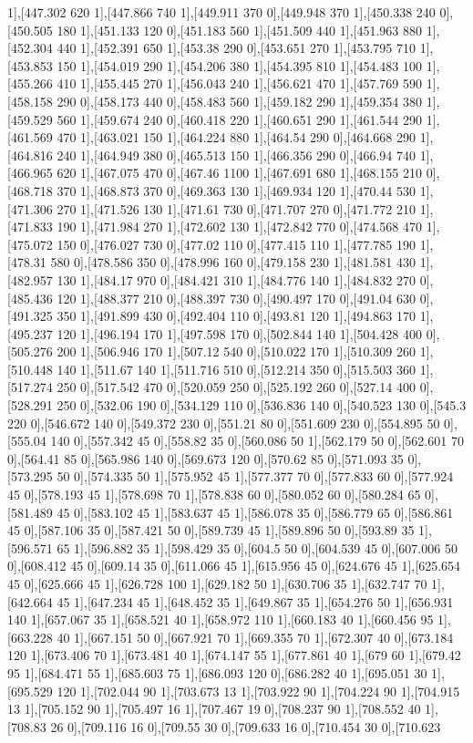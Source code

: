 {1],[447.302 620 1],[447.866 740 1],[449.911 370 0],[449.948 370 1],[450.338 240 0],[450.505 180 1],[451.133 120 0],[451.183 560 1],[451.509 440 1],[451.963 880 1],[452.304 440 1],[452.391 650 1],[453.38 290 0],[453.651 270 1],[453.795 710 1],[453.853 150 1],[454.019 290 1],[454.206 380 1],[454.395 810 1],[454.483 100 1],[455.266 410 1],[455.445 270 1],[456.043 240 1],[456.621 470 1],[457.769 590 1],[458.158 290 0],[458.173 440 0],[458.483 560 1],[459.182 290 1],[459.354 380 1],[459.529 560 1],[459.674 240 0],[460.418 220 1],[460.651 290 1],[461.544 290 1],[461.569 470 1],[463.021 150 1],[464.224 880 1],[464.54 290 0],[464.668 290 1],[464.816 240 1],[464.949 380 0],[465.513 150 1],[466.356 290 0],[466.94 740 1],[466.965 620 1],[467.075 470 0],[467.46 1100 1],[467.691 680 1],[468.155 210 0],[468.718 370 1],[468.873 370 0],[469.363 130 1],[469.934 120 1],[470.44 530 1],[471.306 270 1],[471.526 130 1],[471.61 730 0],[471.707 270 0],[471.772 210 1],[471.833 190 1],[471.984 270 1],[472.602 130 1],[472.842 770 0],[474.568 470 1],[475.072 150 0],[476.027 730 0],[477.02 110 0],[477.415 110 1],[477.785 190 1],[478.31 580 0],[478.586 350 0],[478.996 160 0],[479.158 230 1],[481.581 430 1],[482.957 130 1],[484.17 970 0],[484.421 310 1],[484.776 140 1],[484.832 270 0],[485.436 120 1],[488.377 210 0],[488.397 730 0],[490.497 170 0],[491.04 630 0],[491.325 350 1],[491.899 430 0],[492.404 110 0],[493.81 120 1],[494.863 170 1],[495.237 120 1],[496.194 170 1],[497.598 170 0],[502.844 140 1],[504.428 400 0],[505.276 200 1],[506.946 170 1],[507.12 540 0],[510.022 170 1],[510.309 260 1],[510.448 140 1],[511.67 140 1],[511.716 510 0],[512.214 350 0],[515.503 360 1],[517.274 250 0],[517.542 470 0],[520.059 250 0],[525.192 260 0],[527.14 400 0],[528.291 250 0],[532.06 190 0],[534.129 110 0],[536.836 140 0],[540.523 130 0],[545.3 220 0],[546.672 140 0],[549.372 230 0],[551.21 80 0],[551.609 230 0],[554.895 50 0],[555.04 140 0],[557.342 45 0],[558.82 35 0],[560.086 50 1],[562.179 50 0],[562.601 70 0],[564.41 85 0],[565.986 140 0],[569.673 120 0],[570.62 85 0],[571.093 35 0],[573.295 50 0],[574.335 50 1],[575.952 45 1],[577.377 70 0],[577.833 60 0],[577.924 45 0],[578.193 45 1],[578.698 70 1],[578.838 60 0],[580.052 60 0],[580.284 65 0],[581.489 45 0],[583.102 45 1],[583.637 45 1],[586.078 35 0],[586.779 65 0],[586.861 45 0],[587.106 35 0],[587.421 50 0],[589.739 45 1],[589.896 50 0],[593.89 35 1],[596.571 65 1],[596.882 35 1],[598.429 35 0],[604.5 50 0],[604.539 45 0],[607.006 50 0],[608.412 45 0],[609.14 35 0],[611.066 45 1],[615.956 45 0],[624.676 45 1],[625.654 45 0],[625.666 45 1],[626.728 100 1],[629.182 50 1],[630.706 35 1],[632.747 70 1],[642.664 45 1],[647.234 45 1],[648.452 35 1],[649.867 35 1],[654.276 50 1],[656.931 140 1],[657.067 35 1],[658.521 40 1],[658.972 110 1],[660.183 40 1],[660.456 95 1],[663.228 40 1],[667.151 50 0],[667.921 70 1],[669.355 70 1],[672.307 40 0],[673.184 120 1],[673.406 70 1],[673.481 40 1],[674.147 55 1],[677.861 40 1],[679 60 1],[679.42 95 1],[684.471 55 1],[685.603 75 1],[686.093 120 0],[686.282 40 1],[695.051 30 1],[695.529 120 1],[702.044 90 1],[703.673 13 1],[703.922 90 1],[704.224 90 1],[704.915 13 1],[705.152 90 1],[705.497 16 1],[707.467 19 0],[708.237 90 1],[708.552 40 1],[708.83 26 0],[709.116 16 0],[709.55 30 0],[709.633 16 0],[710.454 30 0],[710.623 }

